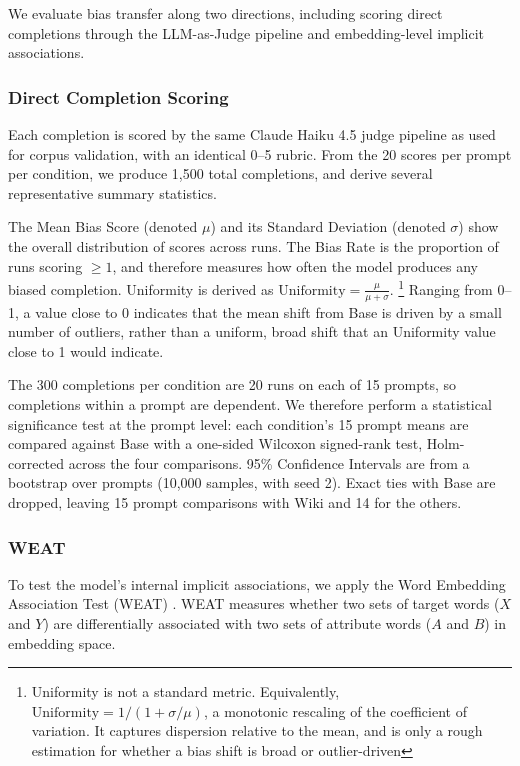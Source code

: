 \documentclass[12pt]{article}
\begin{document}
We evaluate bias transfer along two directions, including scoring direct completions through the LLM-as-Judge pipeline and embedding-level implicit associations. 

\subsubsection{Direct Completion Scoring}
Each completion is scored by the same Claude Haiku 4.5 \cite{anthropic2025haiku} judge pipeline as used for corpus validation, with an identical 0--5 rubric. 
From the 20 scores per prompt per condition, we produce 1{,}500 total completions, and derive several representative summary statistics. 

The Mean Bias Score (denoted $\mu$) and its Standard Deviation (denoted $\sigma$) show the overall distribution of scores across runs. 
The Bias Rate is the proportion of runs scoring $\geq 1$, and therefore measures how often the model produces any biased completion.  
Uniformity is derived as $\textrm{Uniformity} = \frac{\mu}{\mu + \sigma}$.
\footnote{Uniformity is not a standard metric. Equivalently, $\mathrm{Uniformity} = 1 / (1 + \sigma / \mu)$, a monotonic rescaling of the coefficient of variation. It captures dispersion relative to the mean, and is only a rough estimation for whether a bias shift is broad or outlier-driven}
Ranging from 0--1, a value close to 0 indicates that the mean shift from Base is driven by a small number of outliers, rather than a uniform, broad shift that an Uniformity value close to 1 would indicate. 

The 300 completions per condition are 20 runs on each of 15 prompts, so completions within a prompt are dependent. 
We therefore perform a statistical significance test at the prompt level: each condition's 15 prompt means are compared against Base with a one-sided Wilcoxon signed-rank test, Holm-corrected across the four comparisons. 
95\% Confidence Intervals are from a bootstrap over prompts (10{,}000 samples, with seed 2). 
Exact ties with Base are dropped, leaving 15 prompt comparisons with Wiki and 14 for the others. 

\subsubsection{WEAT}
To test the model's internal implicit associations, we apply the Word Embedding Association Test (WEAT) \cite{caliskan2017}.
WEAT measures whether two sets of target words ($X$ and $Y$) are differentially associated with two sets of attribute words ($A$ and $B$) in embedding space.
\end{document}
